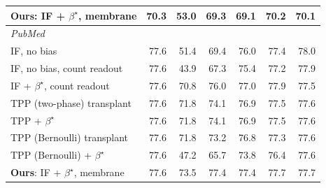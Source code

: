 \begin{table}[t]
\begin{tabular}{lrrrrrr}
\textbf{Ours}: IF + $\beta^\star$, membrane & 70.3 & 53.0 & 69.3 & 69.1 & 70.2 & 70.1 \\
\midrule
\multicolumn{7}{l}{\emph{PubMed}} \\
IF, no bias & 77.6 & 51.4 & 69.4 & 76.0 & 77.4 & 78.0 \\
IF, no bias, count readout & 77.6 & 43.9 & 67.3 & 75.4 & 77.2 & 77.9 \\
IF + $\beta^\star$, count readout & 77.6 & 70.8 & 76.0 & 77.0 & 77.9 & 77.5 \\
TPP (two-phase) transplant & 77.6 & 71.8 & 74.1 & 76.9 & 77.5 & 77.6 \\
TPP + $\beta^\star$ & 77.6 & 71.8 & 74.1 & 76.9 & 77.5 & 77.6 \\
TPP (Bernoulli) transplant & 77.6 & 71.8 & 73.2 & 76.8 & 77.3 & 77.6 \\
TPP (Bernoulli) + $\beta^\star$ & 77.6 & 47.2 & 65.7 & 73.8 & 76.4 & 77.6 \\
\textbf{Ours}: IF + $\beta^\star$, membrane & 77.6 & 73.5 & 77.4 & 77.4 & 77.7 & 77.7 \\
\bottomrule
\end{tabular}
\end{table}
